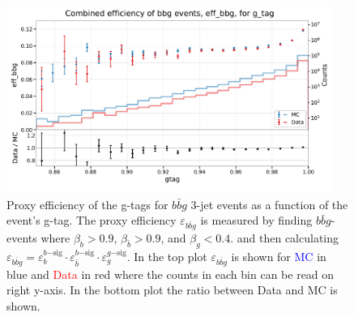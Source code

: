 \documentclass[a4paper, twoside, nobib]{tufte-book}
\begin{document}
\begin{figure}
  \includegraphics[width=0.95\textwidth, trim=0 0 0 40, clip]{figures/quarks/eff_bbg_gtag-down_sample=1.00-ML_vars=vertex-selection=b-ejet_min=4-n_iter_RS_lgb=99-n_iter_RS_xgb=9-cdot_cut=0.90-version=19.pdf}
  \caption[g-Tagging proxy efficiency for $b\bar{b}g$-events as function of g-tag]
          {Proxy efficiency of the g-tags for $b\bar{b}g$ 3-jet events as a function of the event's g-tag. The proxy efficiency $\varepsilon_{b\bar{b}g}$ is measured by finding $b\bar{b}g$-events where $\beta_b > 0.9$, $\beta_{\bar{b}}>0.9$, and $\beta_g < 0.4$. and then calculating  $\varepsilon_{b\bar{b}g} = \varepsilon_b^{b\mathrm{-sig}} \cdot \varepsilon_{\bar{b}}^{b\mathrm{-sig}} \cdot  \varepsilon_g^{g\mathrm{-sig}} $. In the top plot $\varepsilon_{b\bar{b}g}$ is shown for \textcolor{blue}{MC} in blue and \textcolor{red}{Data} in red where the counts in each bin can be read on right y-axis. In the bottom plot the ratio between Data and MC is shown.
          } 
  \label{fig:q:effiency_btag_bbg_gtag}
\end{figure}
\end{document}
